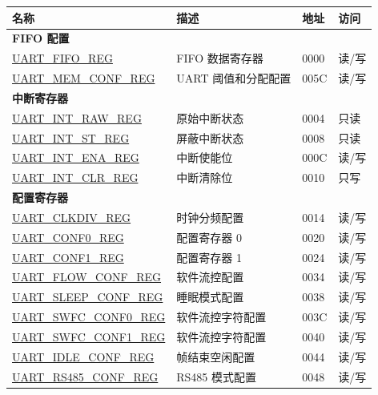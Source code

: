 \begin{longtable}{ | p{6cm} | p{7.2cm} | p{1.3cm} | p{1cm} | }
\hline\rowcolor{lightgray}
名称 & 描述 &  地址 & 访问 \\ \hline
\endhead
\multicolumn{4}{|l|}{\textbf{FIFO 配置}} \\ \hline
\hyperref[regdesc:UARTFIFOREG]{UART\_FIFO\_REG} & FIFO 数据寄存器 & \hexprefix{}0000 & 读/写 \\ \hline
\hyperref[regdesc:UARTMEMCONFREG]{UART\_MEM\_CONF\_REG} & UART 阈值和分配配置 & \hexprefix{}005C & 读/写 \\ \hline
\multicolumn{4}{|l|}{\textbf{中断寄存器}} \\ \hline
\hyperref[regdesc:UARTINTRAWREG]{UART\_INT\_RAW\_REG} & 原始中断状态 & \hexprefix{}0004 & 只读 \\ \hline
\hyperref[regdesc:UARTINTSTREG]{UART\_INT\_ST\_REG} & 屏蔽中断状态 & \hexprefix{}0008 & 只读 \\ \hline
\hyperref[regdesc:UARTINTENAREG]{UART\_INT\_ENA\_REG} & 中断使能位 & \hexprefix{}000C & 读/写 \\ \hline
\hyperref[regdesc:UARTINTCLRREG]{UART\_INT\_CLR\_REG} & 中断清除位 & \hexprefix{}0010 & 只写 \\ \hline
\multicolumn{4}{|l|}{\textbf{配置寄存器}} \\ \hline
\hyperref[regdesc:UARTCLKDIVREG]{UART\_CLKDIV\_REG} & 时钟分频配置 & \hexprefix{}0014 & 读/写 \\ \hline
\hyperref[regdesc:UARTCONF0REG]{UART\_CONF0\_REG} & 配置寄存器 0 & \hexprefix{}0020 & 读/写 \\ \hline
\hyperref[regdesc:UARTCONF1REG]{UART\_CONF1\_REG} & 配置寄存器 1 & \hexprefix{}0024 & 读/写 \\ \hline
\hyperref[regdesc:UARTFLOWCONFREG]{UART\_FLOW\_CONF\_REG} & 软件流控配置 & \hexprefix{}0034 & 读/写 \\ \hline
\hyperref[regdesc:UARTSLEEPCONFREG]{UART\_SLEEP\_CONF\_REG} & 睡眠模式配置 & \hexprefix{}0038 & 读/写 \\ \hline
\hyperref[regdesc:UARTSWFCCONF0REG]{UART\_SWFC\_CONF0\_REG} & 软件流控字符配置 & \hexprefix{}003C & 读/写 \\ \hline
\hyperref[regdesc:UARTSWFCCONF1REG]{UART\_SWFC\_CONF1\_REG} & 软件流控字符配置 & \hexprefix{}0040 & 读/写 \\ \hline
\hyperref[regdesc:UARTIDLECONFREG]{UART\_IDLE\_CONF\_REG} & 帧结束空闲配置 & \hexprefix{}0044 & 读/写 \\ \hline
\hyperref[regdesc:UARTRS485CONFREG]{UART\_RS485\_CONF\_REG} & RS485 模式配置 & \hexprefix{}0048 & 读/写 \\ \hline

\end{longtable}
